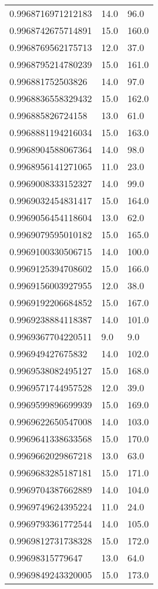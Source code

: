 \begin{center}
\begin{supertabular}[H]{p{0.30\textwidth}p{0.05\textwidth}p{0.05\textwidth}}
0.9968716971212183 & 14.0 & 96.0 \\ 
0.9968742675714891 & 15.0 & 160.0 \\ 
0.9968769562175713 & 12.0 & 37.0 \\ 
0.9968795214780239 & 15.0 & 161.0 \\ 
0.996881752503826 & 14.0 & 97.0 \\ 
0.9968836558329432 & 15.0 & 162.0 \\ 
0.996885826724158 & 13.0 & 61.0 \\ 
0.9968881194216034 & 15.0 & 163.0 \\ 
0.9968904588067364 & 14.0 & 98.0 \\ 
0.9968956141271065 & 11.0 & 23.0 \\ 
0.9969008333152327 & 14.0 & 99.0 \\ 
0.9969032454831417 & 15.0 & 164.0 \\ 
0.9969056454118604 & 13.0 & 62.0 \\ 
0.9969079595010182 & 15.0 & 165.0 \\ 
0.9969100330506715 & 14.0 & 100.0 \\ 
0.9969125394708602 & 15.0 & 166.0 \\ 
0.9969156003927955 & 12.0 & 38.0 \\ 
0.9969192206684852 & 15.0 & 167.0 \\ 
0.9969238884118387 & 14.0 & 101.0 \\ 
0.9969367704220511 & 9.0 & 9.0 \\ 
0.996949427675832 & 14.0 & 102.0 \\ 
0.9969538082495127 & 15.0 & 168.0 \\ 
0.9969571744957528 & 12.0 & 39.0 \\ 
0.9969599896699939 & 15.0 & 169.0 \\ 
0.9969622650547008 & 14.0 & 103.0 \\ 
0.9969641338633568 & 15.0 & 170.0 \\ 
0.9969662029867218 & 13.0 & 63.0 \\ 
0.9969683285187181 & 15.0 & 171.0 \\ 
0.9969704387662889 & 14.0 & 104.0 \\ 
0.9969749624395224 & 11.0 & 24.0 \\ 
0.9969793361772544 & 14.0 & 105.0 \\ 
0.9969812731738328 & 15.0 & 172.0 \\ 
0.99698315779647 & 13.0 & 64.0 \\ 
0.9969849243320005 & 15.0 & 173.0 \\ 

\end{supertabular}
\end{center}
